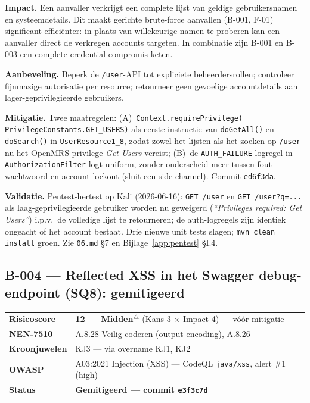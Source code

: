 \documentclass[12pt, a4paper]{report}
\newcommand{\amber}[1]{\textcolor{ragAmber}{\textbf{#1}}}
\newcommand{\groen}[1]{\textcolor{ragGreen}{\textbf{#1}}}
\begin{document}
\textbf{Impact.} Een aanvaller verkrijgt een complete lijst van geldige
gebruikersnamen en systeemdetails. Dit maakt gerichte brute-force aanvallen (B-001, F-01)
significant efficiënter: in plaats van willekeurige namen te proberen kan een
aanvaller direct de verkregen accounts targeten. In combinatie zijn B-001 en B-003
een complete credential-compromis-keten.

\textbf{Aanbeveling.} Beperk de \texttt{/user}-API tot expliciete beheerdersrollen;
controleer fijnmazige autorisatie per resource; retourneer geen gevoelige
accountdetails aan lager-geprivilegieerde gebruikers.

\textbf{Mitigatie.} Twee maatregelen: (A)~\texttt{Context.requirePrivilege(%
PrivilegeConstants.GET\_USERS)} als eerste instructie van \texttt{doGetAll()} en
\texttt{doSearch()} in \texttt{UserResource1\_8}, zodat zowel het lijsten als het
zoeken op \texttt{/user} nu het OpenMRS-privilege \emph{Get Users} vereist; (B)~de
\texttt{AUTH\_FAILURE}-logregel in \texttt{AuthorizationFilter} logt uniform,
zonder onderscheid meer tussen fout wachtwoord en account-lockout (sluit een
side-channel). Commit \texttt{ed6f3da}.

\textbf{Validatie.} Pentest-hertest op Kali (2026-06-16): \texttt{GET /user} en
\texttt{GET /user?q=...} als laag-geprivilegieerde gebruiker worden nu geweigerd
(\emph{``Privileges required: Get Users''}) i.p.v.\ de volledige lijst te
retourneren; de auth-logregels zijn identiek ongeacht of het account bestaat. Drie
nieuwe unit tests slagen; \texttt{mvn clean install} groen. Zie
\texttt{06.md} \S7 en Bijlage~\ref{app:pentest} \S I.4.

\subsection{B-004 --- Reflected XSS in het Swagger debug-endpoint (SQ8): gemitigeerd}
\label{sec:b004}

\begin{tabular}{@{}l >{\raggedright\arraybackslash}p{11.4cm}@{}}
\textbf{Risicoscore} & \amber{12 --- Midden}$^\triangle$ (Kans 3 $\times$ Impact 4) --- vóór mitigatie \\
\textbf{NEN-7510}    & A.8.28 Veilig coderen (output-encoding), A.8.26 \\
\textbf{Kroonjuwelen}& KJ3 --- via overname KJ1, KJ2 \\
\textbf{OWASP}       & A03:2021 Injection (XSS) --- CodeQL \texttt{java/xss}, alert \#1 (high) \\
\textbf{Status}      & \groen{Gemitigeerd --- commit \texttt{e3f3c7d}} \\
\end{tabular}
\end{document}
